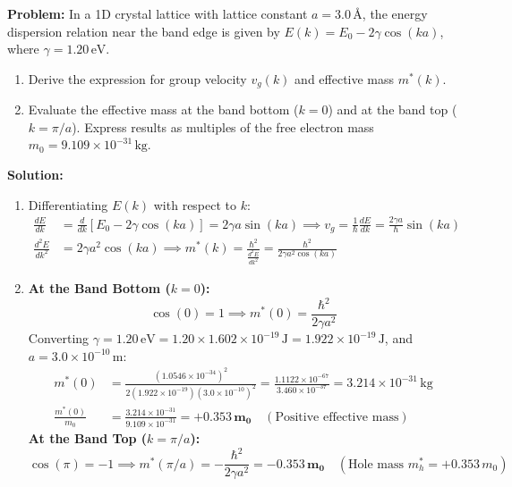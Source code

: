 \begin{examplebox}
\textbf{Problem:} In a 1D crystal lattice with lattice constant $a = 3.0\,\text{\AA}$, the energy dispersion relation near the band edge is given by $E(k) = E_0 - 2\gamma \cos(ka)$, where $\gamma = 1.20\,\text{eV}$.
\begin{enumerate}[label=(\alph*)]
    \item Derive the expression for group velocity $v_g(k)$ and effective mass $m^*(k)$.
    \item Evaluate the effective mass at the band bottom ($k = 0$) and at the band top ($k = \pi/a$). Express results as multiples of the free electron mass $m_0 = 9.109 \times 10^{-31}\,\text{kg}$.
\end{enumerate}

\textbf{Solution:}
\begin{enumerate}[label=(\alph*)]
    \item Differentiating $E(k)$ with respect to $k$:
    \begin{align}
        \frac{dE}{dk} &= \frac{d}{dk}[E_0 - 2\gamma \cos(ka)] = 2\gamma a \sin(ka) \implies v_g = \frac{1}{\hbar}\frac{dE}{dk} = \frac{2\gamma a}{\hbar}\sin(ka) \\
        \frac{d^2E}{dk^2} &= 2\gamma a^2 \cos(ka) \implies m^*(k) = \frac{\hbar^2}{\frac{d^2E}{dk^2}} = \frac{\hbar^2}{2\gamma a^2 \cos(ka)}
    \end{align}
    \item \textbf{At the Band Bottom ($k = 0$):}
    \begin{equation}
        \cos(0) = 1 \implies m^*(0) = \frac{\hbar^2}{2\gamma a^2}
    \end{equation}
    Converting $\gamma = 1.20\,\text{eV} = 1.20 \times 1.602 \times 10^{-19}\,\text{J} = 1.922 \times 10^{-19}\,\text{J}$, and $a = 3.0 \times 10^{-10}\,\text{m}$:
    \begin{align}
        m^*(0) &= \frac{(1.0546 \times 10^{-34})^2}{2(1.922 \times 10^{-19})(3.0 \times 10^{-10})^2} = \frac{1.1122 \times 10^{-67}}{3.460 \times 10^{-37}} = 3.214 \times 10^{-31}\,\text{kg} \\
        \frac{m^*(0)}{m_0} &= \frac{3.214 \times 10^{-31}}{9.109 \times 10^{-31}} = \mathbf{+0.353\,m_0} \quad (\text{Positive effective mass})
    \end{align}
    \textbf{At the Band Top ($k = \pi/a$):}
    \begin{equation}
        \cos(\pi) = -1 \implies m^*(\pi/a) = -\frac{\hbar^2}{2\gamma a^2} = -\mathbf{0.353\,m_0} \quad (\text{Hole mass } m_h^* = +0.353\,m_0)
    \end{equation}
\end{enumerate}
\end{examplebox}

